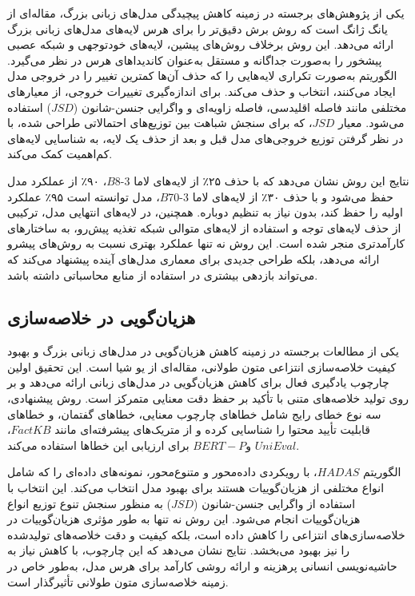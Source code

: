 یکی از پژوهش‌های برجسته در زمینه کاهش پیچیدگی مدل‌های زبانی بزرگ، مقاله‌ای از یانگ ژانگ است که روش برش دقیق‌تر  را برای هرس لایه‌های مدل‌های زبانی بزرگ ارائه می‌دهد. این روش برخلاف روش‌های پیشین، لایه‌های خودتوجهی و شبکه عصبی پیشخور را به‌صورت جداگانه و مستقل به‌عنوان کاندیداهای هرس در نظر می‌گیرد. الگوریتم به‌صورت تکراری لایه‌هایی را که حذف آن‌ها کمترین تغییر را در خروجی مدل ایجاد می‌کنند، انتخاب و حذف می‌کند. برای اندازه‌گیری تغییرات خروجی، از معیارهای مختلفی مانند فاصله اقلیدسی، فاصله زاویه‌ای و واگرایی جنسن-شانون ($JSD$) استفاده می‌شود. معیار $JSD$، که برای سنجش شباهت بین توزیع‌های احتمالاتی طراحی شده، با در نظر گرفتن توزیع خروجی‌های مدل قبل و بعد از حذف یک لایه، به شناسایی لایه‌های کم‌اهمیت کمک می‌کند.

نتایج این روش نشان می‌دهد که با حذف ۲۵٪ از لایه‌های لاما 3-8$B$، ۹۰٪ از عملکرد مدل حفظ می‌شود و با حذف ۳۰٪ از لایه‌های لاما 3-70$B$، مدل توانسته است ۹۵٪ عملکرد اولیه را حفظ کند، بدون نیاز به تنظیم دوباره. همچنین، در لایه‌های انتهایی مدل، ترکیبی از حذف لایه‌های توجه و استفاده از لایه‌های متوالی شبکه تغذیه پیش‌رو، به ساختارهای کارآمدتری منجر شده است. این روش نه تنها عملکرد بهتری نسبت به روش‌های پیشرو ارائه می‌دهد، بلکه طراحی جدیدی برای معماری مدل‌های آینده پیشنهاد می‌کند که می‌تواند بازدهی بیشتری در استفاده از منابع محاسباتی داشته باشد\cite{zhang2024finercut}.



\subsection{هزیان‌گویی در خلاصه‌سازی}
یکی از مطالعات برجسته در زمینه کاهش هزیان‌گویی در مدل‌های زبانی بزرگ  و بهبود کیفیت خلاصه‌سازی انتزاعی متون طولانی، مقاله‌ای از یو شیا است. این تحقیق اولین چارچوب یادگیری فعال برای کاهش هزیان‌گویی در مدل‌های زبانی ارائه می‌دهد و بر روی تولید خلاصه‌های متنی با تأکید بر حفظ دقت معنایی متمرکز است. روش پیشنهادی، سه نوع خطای رایج شامل خطاهای چارچوب معنایی، خطاهای گفتمان، و خطاهای قابلیت تأیید محتوا را شناسایی کرده و از متریک‌های پیشرفته‌ای مانند $FactKB$، $UniEval$ و$ BERT-P$ برای ارزیابی این خطاها استفاده می‌کند.

الگوریتم $HADAS$، با رویکردی داده‌محور و متنوع‌محور، نمونه‌های داده‌ای را که شامل انواع مختلفی از هزیان‌گوییات هستند برای بهبود مدل انتخاب می‌کند. این انتخاب با استفاده از واگرایی جنسن-شانون ($JSD$) به منظور سنجش تنوع توزیع انواع هزیان‌گوییات انجام می‌شود. این روش نه تنها به طور مؤثری هزیان‌گوییات در خلاصه‌سازی‌های انتزاعی را کاهش داده است، بلکه کیفیت و دقت خلاصه‌های تولیدشده را نیز بهبود می‌بخشد. نتایج نشان می‌دهد که این چارچوب، با کاهش نیاز به حاشیه‌نویسی انسانی پرهزینه و ارائه روشی کارآمد برای هرس مدل، به‌طور خاص در زمینه خلاصه‌سازی متون طولانی تأثیرگذار است\cite{xia2024hallucinationdiversityawareactivelearning}.


